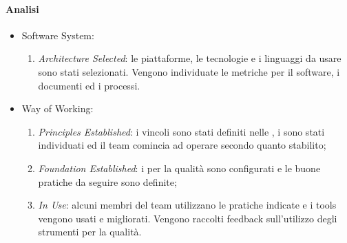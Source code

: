    	\paragraph{Analisi}
    	\begin{itemize}
    		\item Software System:
    			\begin{enumerate}
    				\item \emph{Architecture Selected}: le piattaforme, le tecnologie e i linguaggi da usare sono stati selezionati. Vengono individuate le metriche per il software, i documenti ed i processi.
    			\end{enumerate}
    		\item Way of Working:
    			\begin{enumerate}
    				\item \emph{Principles Established}: i vincoli sono stati definiti nelle \NormeDiProgetto, i  sono stati individuati ed il team comincia ad operare secondo quanto stabilito;
    				\item \emph{Foundation Established}: i  per la qualità sono configurati e le buone pratiche da seguire sono definite;
    				\item \emph{In Use}: alcuni membri del team utilizzano le pratiche indicate e i tools vengono usati e migliorati. Vengono raccolti feedback sull'utilizzo degli strumenti per la qualità.
    			\end{enumerate}
    	\end{itemize}
    	

